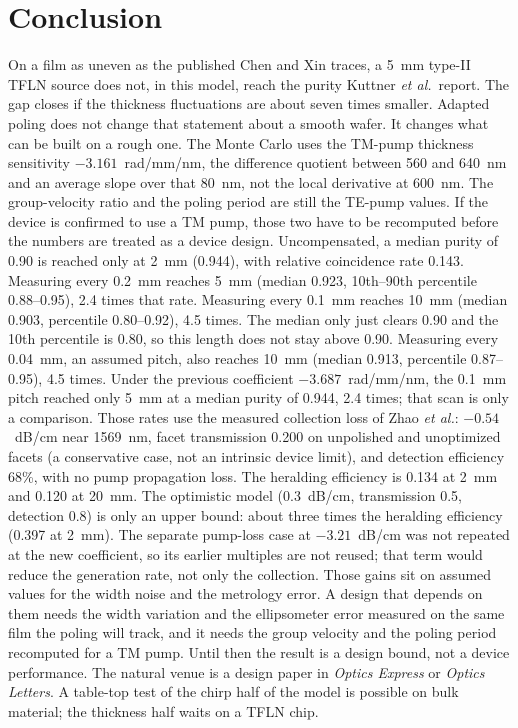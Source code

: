 \documentclass[11pt,a4paper]{article}
\begin{document}
\section{Conclusion}
On a film as uneven as the published Chen and Xin traces, a 5~mm type-II TFLN source does not, in this model, reach the purity Kuttner \emph{et al.}\ report.
The gap closes if the thickness fluctuations are about seven times smaller.
Adapted poling does not change that statement about a smooth wafer.
It changes what can be built on a rough one.
The Monte Carlo uses the TM-pump thickness sensitivity $-3.161$~rad/mm/nm, the difference quotient between 560 and 640~nm and an average slope over that 80~nm, not the local derivative at 600~nm.
The group-velocity ratio and the poling period are still the TE-pump values.
If the device is confirmed to use a TM pump, those two have to be recomputed before the numbers are treated as a device design.
Uncompensated, a median purity of 0.90 is reached only at 2~mm (0.944), with relative coincidence rate 0.143.
Measuring every 0.2~mm reaches 5~mm (median 0.923, 10th--90th percentile 0.88--0.95), 2.4 times that rate.
Measuring every 0.1~mm reaches 10~mm (median 0.903, percentile 0.80--0.92), 4.5 times.
The median only just clears 0.90 and the 10th percentile is 0.80, so this length does not stay above 0.90.
Measuring every 0.04~mm, an assumed pitch, also reaches 10~mm (median 0.913, percentile 0.87--0.95), 4.5 times.
Under the previous coefficient $-3.687$~rad/mm/nm, the 0.1~mm pitch reached only 5~mm at a median purity of 0.944, 2.4 times; that scan is only a comparison.
Those rates use the measured collection loss of Zhao \emph{et al.}: $-0.54$~dB/cm near 1569~nm, facet transmission 0.200 on unpolished and unoptimized facets (a conservative case, not an intrinsic device limit), and detection efficiency 68\%, with no pump propagation loss.
The heralding efficiency is 0.134 at 2~mm and 0.120 at 20~mm.
The optimistic model (0.3~dB/cm, transmission 0.5, detection 0.8) is only an upper bound: about three times the heralding efficiency (0.397 at 2~mm).
The separate pump-loss case at $-3.21$~dB/cm was not repeated at the new coefficient, so its earlier multiples are not reused; that term would reduce the generation rate, not only the collection.
Those gains sit on assumed values for the width noise and the metrology error.
A design that depends on them needs the width variation and the ellipsometer error measured on the same film the poling will track, and it needs the group velocity and the poling period recomputed for a TM pump.
Until then the result is a design bound, not a device performance.
The natural venue is a design paper in \emph{Optics Express} or \emph{Optics Letters}.
A table-top test of the chirp half of the model is possible on bulk material; the thickness half waits on a TFLN chip.



\end{document}
